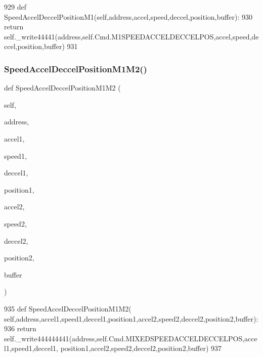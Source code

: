 \begin{DoxyCode}
929     \textcolor{keyword}{def }SpeedAccelDeccelPositionM1(self,address,accel,speed,deccel,position,buffer):
930         \textcolor{keywordflow}{return} self.\_write44441(address,self.Cmd.M1SPEEDACCELDECCELPOS,accel,speed,deccel,position,buffer)
931 
\end{DoxyCode}
\mbox{\label{classtoxic__hardware_1_1roboclaw__3_1_1Roboclaw_a67d7a0f215dd04abdc264e6f86186542}} 
\subsubsection{\texorpdfstring{Speed\+Accel\+Deccel\+Position\+M1\+M2()}{SpeedAccelDeccelPositionM1M2()}}
{\footnotesize\ttfamily def Speed\+Accel\+Deccel\+Position\+M1\+M2 (\begin{DoxyParamCaption}\item[{}]{self,  }\item[{}]{address,  }\item[{}]{accel1,  }\item[{}]{speed1,  }\item[{}]{deccel1,  }\item[{}]{position1,  }\item[{}]{accel2,  }\item[{}]{speed2,  }\item[{}]{deccel2,  }\item[{}]{position2,  }\item[{}]{buffer }\end{DoxyParamCaption})}


\begin{DoxyCode}
935     \textcolor{keyword}{def }SpeedAccelDeccelPositionM1M2(
      self,address,accel1,speed1,deccel1,position1,accel2,speed2,deccel2,position2,buffer):
936         \textcolor{keywordflow}{return} self.\_write444444441(address,self.Cmd.MIXEDSPEEDACCELDECCELPOS,accel1,speed1,deccel1,
      position1,accel2,speed2,deccel2,position2,buffer)
937 
\end{DoxyCode}
\mbox{\label{classtoxic__hardware_1_1roboclaw__3_1_1Roboclaw_ae7008907206f5accff98fe60a85dc124}} 
